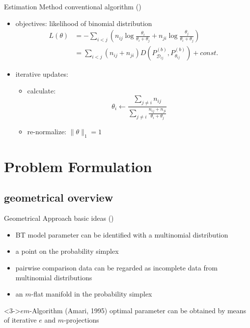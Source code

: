 \documentclass[fleqn,aspectratio=1610]{beamer}
\begin{document}
\begin{frame}[label={sec:org9ad38ba}]{Estimation Method}
conventional algorithm
(\cite{HastieTibshirani1998})
\begin{itemize}
\item objectives: likelihood of binomial distribution
\begin{align}
  L(\theta)
  &=-\sum_{i<j}\left(
    n_{ij}\log\frac{\theta_{i}}{\theta_{i}+\theta_{j}}+
    n_{ji}\log\frac{\theta_{j}}{\theta_{i}+\theta_{j}}
    \right)\\
  &=\sum_{i<j}(n_{ij}+n_{ji})
    D(P^{(b)}_{\mathcal{D}_{ij}},P^{(b)}_{\theta_{ij}})
    +const.
\end{align}
\item iterative updates:
\begin{itemize}
\item calculate:
\begin{equation}
  \theta_{i}
  \leftarrow\frac{\sum_{j\not=i}n_{ij}}
  {\sum_{j\not=i}\frac{n_{ij}+n_{ji}}{\theta_{i}+\theta_{j}}}
\end{equation}
\item re-normalize: \(\|\theta\|_{1}=1\)
\end{itemize}
\end{itemize}
\end{frame}


\section{Problem Formulation}
\label{sec:org62bed98}
\subsection{geometrical overview}
\label{sec:org9e8f4ed}
\begin{frame}[label={sec:org0327143}]{Geometrical Approach}
basic ideas (\cite{FujimotoHinoMurata2011})
\begin{itemize}
\item BT model parameter can be identified with a multinomial distribution
\item <2-| alert@2>[] a point on the probability simplex
\item pairwise comparison data can be regarded as 
incomplete data from multinomial distributions
\item <2-| alert@2>[] an \(m\)-flat manifold in the probability simplex
\end{itemize}
\begin{alertblock}<3->{\(em\)-Algorithm (Amari, 1995)}
optimal parameter can be obtained by means of
iterative \(e\) and \(m\)-projections
\end{alertblock}
\end{frame}
\end{document}
